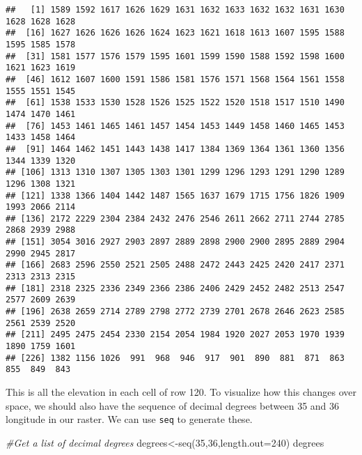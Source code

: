 \documentclass[
]{book}
\newenvironment{Shaded}{\begin{snugshade}}{\end{snugshade}}
\newcommand{\AttributeTok}[1]{\textcolor[rgb]{0.77,0.63,0.00}{#1}}
\newcommand{\CommentTok}[1]{\textcolor[rgb]{0.56,0.35,0.01}{\textit{#1}}}
\newcommand{\DecValTok}[1]{\textcolor[rgb]{0.00,0.00,0.81}{#1}}
\newcommand{\FunctionTok}[1]{\textcolor[rgb]{0.00,0.00,0.00}{#1}}
\newcommand{\NormalTok}[1]{#1}
\newcommand{\OtherTok}[1]{\textcolor[rgb]{0.56,0.35,0.01}{#1}}
\begin{document}
\begin{verbatim}
##   [1] 1589 1592 1617 1626 1629 1631 1632 1633 1632 1632 1631 1630 1628 1628 1628
##  [16] 1627 1626 1626 1626 1624 1623 1621 1618 1613 1607 1595 1588 1595 1585 1578
##  [31] 1581 1577 1576 1579 1595 1601 1599 1590 1588 1592 1598 1600 1621 1623 1619
##  [46] 1612 1607 1600 1591 1586 1581 1576 1571 1568 1564 1561 1558 1555 1551 1545
##  [61] 1538 1533 1530 1528 1526 1525 1522 1520 1518 1517 1510 1490 1474 1470 1461
##  [76] 1453 1461 1465 1461 1457 1454 1453 1449 1458 1460 1465 1453 1433 1458 1464
##  [91] 1464 1462 1451 1443 1438 1417 1384 1369 1364 1361 1360 1356 1344 1339 1320
## [106] 1313 1310 1307 1305 1303 1301 1299 1296 1293 1291 1290 1289 1296 1308 1321
## [121] 1338 1366 1404 1442 1487 1565 1637 1679 1715 1756 1826 1909 1993 2066 2114
## [136] 2172 2229 2304 2384 2432 2476 2546 2611 2662 2711 2744 2785 2868 2939 2988
## [151] 3054 3016 2927 2903 2897 2889 2898 2900 2900 2895 2889 2904 2990 2945 2817
## [166] 2683 2596 2550 2521 2505 2488 2472 2443 2425 2420 2417 2371 2313 2313 2315
## [181] 2318 2325 2336 2349 2366 2386 2406 2429 2452 2482 2513 2547 2577 2609 2639
## [196] 2638 2659 2714 2789 2798 2772 2739 2701 2678 2646 2623 2585 2561 2539 2520
## [211] 2495 2475 2454 2330 2154 2054 1984 1920 2027 2053 1970 1939 1890 1759 1601
## [226] 1382 1156 1026  991  968  946  917  901  890  881  871  863  855  849  843
\end{verbatim}

This is all the elevation in each cell of row 120. To visualize how this changes over space, we should also have the sequence of decimal degrees between 35 and 36 longitude in our raster. We can use \texttt{seq} to generate these.

\begin{Shaded}
\begin{Highlighting}[]
\CommentTok{\#Get a list of decimal degrees}
\NormalTok{degrees}\OtherTok{\textless{}{-}}\FunctionTok{seq}\NormalTok{(}\DecValTok{35}\NormalTok{,}\DecValTok{36}\NormalTok{,}\AttributeTok{length.out=}\DecValTok{240}\NormalTok{)}
\NormalTok{degrees}
\end{Highlighting}
\end{Shaded}
\end{document}
